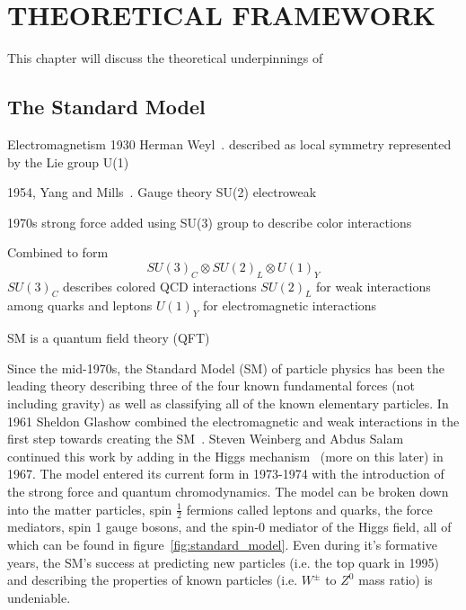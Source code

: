 %
%
%


\chapter{\uppercase {Theoretical Framework}}
\label{ch:theoretical_framework}

This chapter will discuss the theoretical underpinnings of 


\section{The Standard Model}

Electromagnetism 1930 Herman Weyl~\cite{Weyl1929}.
	described as local symmetry represented by the Lie group U(1)

1954, Yang and Mills~\cite{PhysRev.96.191}.
	Gauge theory SU(2)
	electroweak

1970s strong force added using SU(3) group to describe color interactions

Combined to form
\begin{equation}\label{eq:standard_model_groups}
SU\left(3\right)_{C}{\otimes}SU\left(2\right)_{L}{\otimes}U\left(1\right)_{Y}
\end{equation}
$SU\left(3\right)_{C}$ describes colored QCD interactions
$SU\left(2\right)_{L}$ for weak interactions among quarks and leptons
$U\left(1\right)_{Y}$ for electromagnetic interactions

SM is a quantum field theory (QFT)


Since the mid-1970s, the Standard Model (SM) of particle physics has been the leading theory describing three of the four known fundamental forces (not including gravity) as well as classifying all of the known elementary particles.
In 1961 Sheldon Glashow combined the electromagnetic and weak interactions in the first step towards creating the SM~\cite{GLASHOW1961579}.
Steven Weinberg and Abdus Salam~\cite{PhysRevLett.19.1264,salam} continued this work by adding in the Higgs mechanism~\cite{PhysRevLett.13.321,PhysRevLett.13.508,PhysRevLett.13.585} (more on this later) in 1967.
The model entered its current form in 1973-1974 with the introduction of the strong force and quantum chromodynamics.
The model can be broken down into the matter particles, spin $\frac{1}{2}$ fermions called leptons and quarks, the force mediators, spin 1 gauge bosons, and the spin-0 mediator of the Higgs field, all of which can be found in figure~\ref{fig:standard_model}.
Even during it's formative years, the SM's success at predicting new particles (i.e. the top quark in 1995) and describing the properties of known particles (i.e. $W^{\pm}$ to $Z^{0}$ mass ratio) is undeniable.


